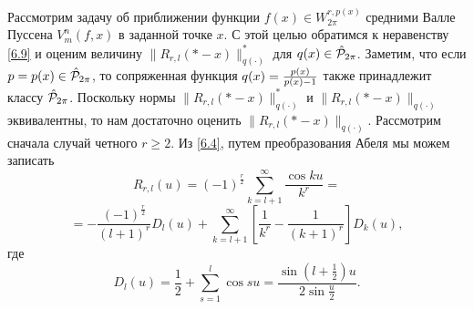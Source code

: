 Рассмотрим задачу об приближении  функции $f(x)\in  W^{r,p(x)}_{2\pi}$ средними Валле Пуссена $V_m^n(f,x)$ в заданной точке $x$. С этой целью обратимся к неравенству \eqref{6.9} и оценим величину $\|R_{r,l}(*-x)\|_{q(\cdot)}^*$ для $q(x)\in \hat{\cal  P}_{2\pi}$. Заметим, что если   $p=p(x)\in\hat{\cal  P}_{2\pi}$, то сопряженная функция $q(x)={p(x)\over p(x)-1}$ также принадлежит классу $\hat{\cal  P}_{2\pi}$.
  Поскольку нормы $\|R_{r,l}(*-x)\|_{q(\cdot)}^*$ и $\|R_{r,l}(*-x)\|_{q(\cdot)}$ эквивалентны, то нам достаточно оценить $\|R_{r,l}(*-x)\|_{q(\cdot)}$.
 Рассмотрим сначала случай четного $r\ge2$. Из \eqref{6.4}, путем преобразования Абеля мы можем записать
$$
 R_{r,l}(u)  =(-1)^{\frac{r}{2}}\sum\limits_{k=l+1}^{\infty}\frac{\cos ku}{ k^r}=
$$
\begin{equation} \label{8.1}
    =-\frac{(-1)^\frac{r}{2}}{(l+1)^r}D_l(u)+\sum\limits_{k=l+1}^\infty[\frac{1}{ k^r}-\frac{1}{(k+1)^r}]D_k(u),
\end{equation}
где
$$
D_{l}(u)=\frac12+\sum\limits_{s=1}^{l}\cos su=\frac{\sin(l+\frac12)u}{2\sin\frac{u}2}.
$$

